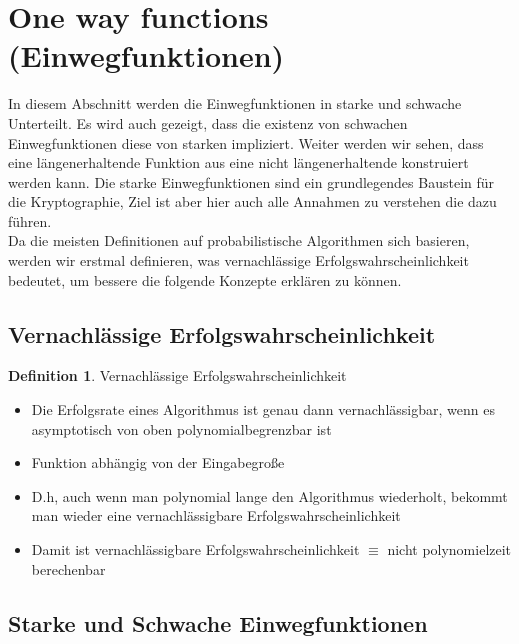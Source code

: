 \documentclass[12pt,a4paper]{article}
\theoremstyle{definition}
\newtheorem{definition}[theorem]{Definition}
\begin{document}
    \section{One way functions (Einwegfunktionen)}

    In diesem Abschnitt werden die Einwegfunktionen in starke und schwache Unterteilt. Es wird auch gezeigt, dass die
    existenz von schwachen Einwegfunktionen diese von starken impliziert. Weiter werden wir sehen, dass eine
    längenerhaltende Funktion aus eine nicht längenerhaltende konstruiert werden kann. Die starke Einwegfunktionen
    sind ein grundlegendes Baustein für die Kryptographie, Ziel ist aber hier auch alle Annahmen zu verstehen die dazu
    führen. \\
    Da die meisten Definitionen auf probabilistische Algorithmen sich basieren, werden wir erstmal definieren, was
    vernachlässige Erfolgswahrscheinlichkeit bedeutet, um bessere die folgende Konzepte erklären zu können.

    \subsection{Vernachlässige Erfolgswahrscheinlichkeit}

    \begin{definition}
        Vernachlässige Erfolgswahrscheinlichkeit
        \begin{itemize}
            \item Die Erfolgsrate eines Algorithmus ist genau dann vernachlässigbar, wenn es asymptotisch von oben
                polynomialbegrenzbar ist
            \item Funktion abhängig von der Eingabegroße
            \item D.h, auch wenn man polynomial lange den Algorithmus wiederholt, bekommt man wieder eine
                vernachlässigbare Erfolgswahrscheinlichkeit
            \item Damit ist vernachlässigbare Erfolgswahrscheinlichkeit $\equiv$ nicht polynomielzeit berechenbar
        \end{itemize}
    \end{definition}

    \subsection{Starke und Schwache Einwegfunktionen}
\end{document}
